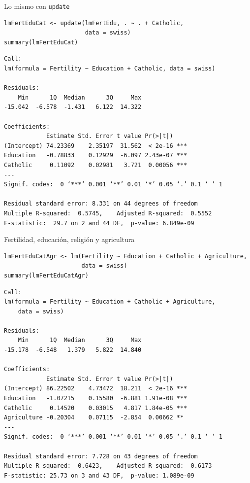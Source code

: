 \documentclass[xcolor={usenames,svgnames,dvipsnames}]{beamer}
\begin{document}
\begin{frame}[fragile,label=sec-5-6]{Lo mismo con \texttt{update}}
 \lstset{language=R,label= ,caption= ,numbers=none}
\begin{lstlisting}
lmFertEduCat <- update(lmFertEdu, . ~ . + Catholic,
                       data = swiss)
summary(lmFertEduCat)
\end{lstlisting}

\begin{verbatim}
Call:
lm(formula = Fertility ~ Education + Catholic, data = swiss)

Residuals:
    Min      1Q  Median      3Q     Max 
-15.042  -6.578  -1.431   6.122  14.322 

Coefficients:
            Estimate Std. Error t value Pr(>|t|)    
(Intercept) 74.23369    2.35197  31.562  < 2e-16 ***
Education   -0.78833    0.12929  -6.097 2.43e-07 ***
Catholic     0.11092    0.02981   3.721  0.00056 ***
---
Signif. codes:  0 ‘***’ 0.001 ‘**’ 0.01 ‘*’ 0.05 ‘.’ 0.1 ‘ ’ 1

Residual standard error: 8.331 on 44 degrees of freedom
Multiple R-squared:  0.5745,	Adjusted R-squared:  0.5552 
F-statistic:  29.7 on 2 and 44 DF,  p-value: 6.849e-09
\end{verbatim}
\end{frame}


\begin{frame}[fragile,label=sec-5-7]{Fertilidad, educación, religión y agricultura}
 \lstset{language=R,label= ,caption= ,numbers=none}
\begin{lstlisting}
lmFertEduCatAgr <- lm(Fertility ~ Education + Catholic + Agriculture,
                      data = swiss)
summary(lmFertEduCatAgr)
\end{lstlisting}

\begin{verbatim}
Call:
lm(formula = Fertility ~ Education + Catholic + Agriculture, 
    data = swiss)

Residuals:
    Min      1Q  Median      3Q     Max 
-15.178  -6.548   1.379   5.822  14.840 

Coefficients:
            Estimate Std. Error t value Pr(>|t|)    
(Intercept) 86.22502    4.73472  18.211  < 2e-16 ***
Education   -1.07215    0.15580  -6.881 1.91e-08 ***
Catholic     0.14520    0.03015   4.817 1.84e-05 ***
Agriculture -0.20304    0.07115  -2.854  0.00662 ** 
---
Signif. codes:  0 ‘***’ 0.001 ‘**’ 0.01 ‘*’ 0.05 ‘.’ 0.1 ‘ ’ 1

Residual standard error: 7.728 on 43 degrees of freedom
Multiple R-squared:  0.6423,	Adjusted R-squared:  0.6173 
F-statistic: 25.73 on 3 and 43 DF,  p-value: 1.089e-09
\end{verbatim}
\end{frame}
\end{document}
